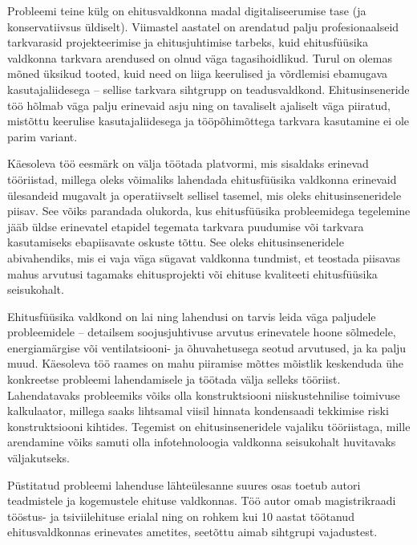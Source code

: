 Probleemi teine külg on ehitusvaldkonna madal digitaliseerumise tase (ja konservatiivsus üldiselt). Viimastel aastatel on 
arendatud palju profesionaalseid tarkvarasid projekteerimise ja ehitusjuhtimise tarbeks, kuid ehitusfüüsika valdkonna 
tarkvara arendused on olnud väga tagasihoidlikud. Turul on olemas mõned üksikud tooted, kuid need on liiga keerulised ja võrdlemisi 
ebamugava kasutajaliidesega -- sellise tarkvara sihtgrupp on teadusvaldkond. Ehitusinseneride töö hõlmab väga palju erinevaid asju 
ning on tavaliselt ajaliselt väga piiratud, mistõttu keerulise kasutajaliidesega ja tööpõhimõttega tarkvara kasutamine ei ole parim variant. 

Käesoleva töö eesmärk on välja töötada platvormi, mis sisaldaks erinevad tööriistad, millega oleks võimaliks lahendada ehitusfüüsika valdkonna erinevaid ülesandeid mugavalt 
ja operatiivselt sellisel tasemel, mis oleks ehitusinseneridele piisav. See võiks parandada olukorda, kus ehitusfüüsika probleemidega tegelemine
jääb üldse erinevatel etapidel tegemata tarkvara puudumise või tarkvara kasutamiseks ebapiisavate oskuste tõttu. 
See oleks ehitusinseneridele abivahendiks, mis ei vaja väga sügavat valdkonna tundmist, et teostada piisavas mahus arvutusi 
tagamaks ehitusprojekti või ehituse kvaliteeti ehitusfüüsika seisukohalt. 

Ehitusfüüsika valdkond on lai ning lahendusi on tarvis leida väga paljudele probleemidele -- detailsem soojusjuhtivuse arvutus erinevatele hoone sõlmedele,
energiamärgise või ventilatsiooni- ja õhuvahetusega seotud arvutused, ja ka palju muud. Käesoleva töö raames on mahu piiramise mõttes mõistlik
keskenduda ühe konkreetse probleemi lahendamisele ja töötada välja selleks tööriist. Lahendatavaks probleemiks võiks olla konstruktsiooni
niiskustehnilise toimivuse kalkulaator, millega saaks lihtsamal viisil hinnata kondensaadi tekkimise riski konstruktsiooni kihtides.
Tegemist on ehitusinseneridele vajaliku tööriistaga, mille arendamine võiks samuti olla infotehnoloogia valdkonna seisukohalt
huvitavaks väljakutseks.

Püstitatud probleemi lahenduse lähteülesanne suures osas toetub autori teadmistele ja kogemustele ehituse valdkonnas. Töö autor omab magistrikraadi
tööstus- ja tsiviilehituse erialal ning on rohkem kui 10 aastat töötanud ehitusvaldkonnas erinevates ametites, seetõttu aimab sihtgrupi vajadustest. 